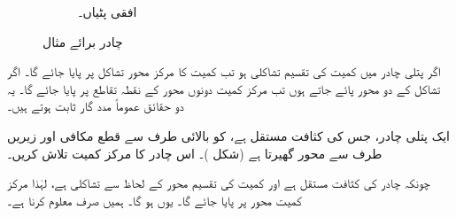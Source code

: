 \begin{figure}
\begin{subfigure}{0.34\textwidth}
\caption{افقی پٹیاں۔}
\end{subfigure}
\caption{چادر برائے مثال }
\label{شکل_مثال_تکمل_استعمال_چادر_کثافت}
\end{figure}

اگر پتلی چادر میں کمیت کی تقسیم تشاکلی ہو تب کمیت کا مرکز محور  تشاکل پر پایا جائے گا۔ اگر تشاکل کے دو محور پائے جاتے ہوں تب مرکز کمیت دونوں محور کے نقطہ تقاطع پر پایا جائے گا۔ یہ دو حقائق عموماً مدد گار ثابت ہوتے ہیں۔

ایک پتلی چادر، جس  کی کثافت مستقل  ہے، کو بالائی طرف سے قطع مکافی  اور زیریں طرف سے محور   گھیرتا ہے (شکل )۔ اس چادر کا مرکز کمیت تلاش کریں۔

چونکہ  چادر  کی کثافت مستقل ہے اور  کمیت  کی تقسیم محور  کے لحاظ سے تشاکلی ہے، لہٰذا مرکز کمیت محور  پر پایا جائے گا۔ یوں  ہو گا۔ ہمیں صرف  معلوم کرنا ہے۔

